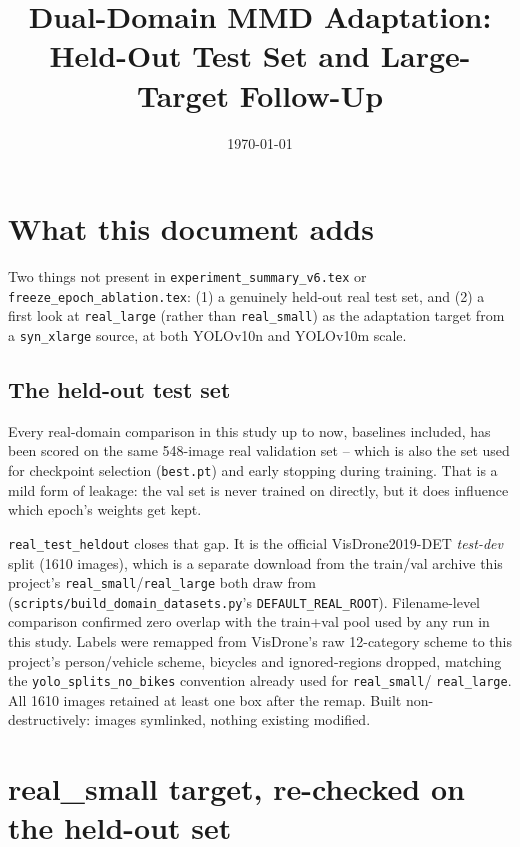 \documentclass[11pt]{article}
\title{Dual-Domain MMD Adaptation: Held-Out Test Set and Large-Target Follow-Up}
\author{}
\date{\today}
\begin{document}
\maketitle

\section{What this document adds}

Two things not present in \texttt{experiment\_summary\_v6.tex} or
\texttt{freeze\_epoch\_ablation.tex}: (1) a genuinely held-out real test set, and
(2) a first look at \texttt{real\_large} (rather than \texttt{real\_small}) as the
adaptation target from a \texttt{syn\_xlarge} source, at both YOLOv10n and YOLOv10m
scale.

\subsection{The held-out test set}

Every real-domain comparison in this study up to now, baselines included, has been
scored on the same 548-image real validation set -- which is also the set used for
checkpoint selection (\texttt{best.pt}) and early stopping during training. That is a
mild form of leakage: the val set is never trained on directly, but it does influence
which epoch's weights get kept.

\texttt{real\_test\_heldout} closes that gap. It is the official VisDrone2019-DET
\emph{test-dev} split (1610 images), which is a separate download from the
train/val archive this project's \texttt{real\_small}/\texttt{real\_large} both draw
from (\texttt{scripts/build\_domain\_datasets.py}'s \texttt{DEFAULT\_REAL\_ROOT}).
Filename-level comparison confirmed zero overlap with the train+val pool used by any
run in this study. Labels were remapped from VisDrone's raw 12-category scheme to
this project's person/vehicle scheme, bicycles and ignored-regions dropped, matching
the \texttt{yolo\_splits\_no\_bikes} convention already used for \texttt{real\_small}/
\texttt{real\_large}. All 1610 images retained at least one box after the remap.
Built non-destructively: images symlinked, nothing existing modified.

\section{real\_small target, re-checked on the held-out set}
\end{document}
